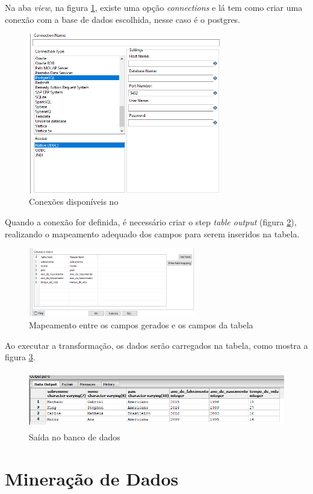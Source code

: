 Na aba \textit{view}, na figura \ref{database}, existe uma opção \textit{connections} e lá tem como criar uma conexão com a base de dados escolhida, nesse caso é o postgres.\\
\begin{figure}[H]
\centering
\includegraphics[height=7cm]{imagens/conexao.png}
\caption{Conexões disponíveis no \pdi}
\label{database}
\end{figure}
Quando a conexão for definida, é necessário criar o step \textit{table output }(figura \ref{outputtable}), realizando o mapeamento adequado dos campos para serem inseridos na tabela.
\begin{figure}[H]
\centering
\includegraphics[height=3cm]{imagens/tablemapping.png}
\caption{Mapeamento entre os campos gerados e os campos da tabela}
\label{outputtable}
\end{figure}
Ao executar a transformação, os dados serão carregados na tabela, como mostra a figura \ref{table}.
\begin{figure}[H]
\centering
\includegraphics[height=2.5cm]{imagens/saidasql.png}
\caption{Saída no banco de dados}
\label{table}
\end{figure}

\section{Mineração de Dados}

